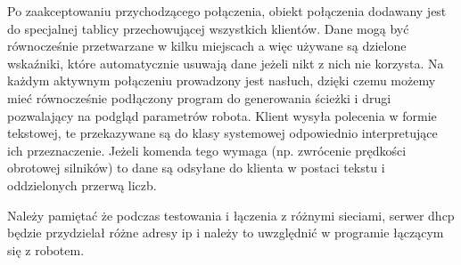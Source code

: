 Po zaakceptowaniu przychodzącego połączenia, obiekt połączenia dodawany jest do specjalnej tablicy przechowującej wszystkich klientów. 
Dane mogą być równocześnie przetwarzane w kilku miejscach a więc używane są dzielone wskaźniki, które automatycznie usuwają dane jeżeli nikt z nich nie korzysta.
Na każdym aktywnym połączeniu prowadzony jest nasłuch, dzięki czemu możemy mieć równocześnie podłączony program do generowania ścieżki i drugi pozwalający na podgląd parametrów robota.
Klient wysyła polecenia w formie tekstowej, te przekazywane są do klasy systemowej odpowiednio interpretujące ich przeznaczenie.
Jeżeli komenda tego wymaga (np. zwrócenie prędkości obrotowej silników) to dane są odsyłane do klienta w postaci tekstu i oddzielonych przerwą liczb. 

Należy pamiętać że podczas testowania i łączenia z różnymi sieciami, serwer dhcp będzie przydzielał różne adresy ip i należy to uwzględnić w programie łączącym się z robotem.
